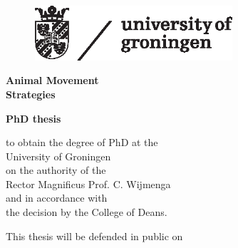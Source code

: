 
\begin{titlepage}
    \begin{addmargin}[-1cm]{-3cm}
    \begin{center}

        \hfill
        \begin{figure}
            \includegraphics[width=7.38cm,height=2.03cm]{figures/rug_logo.eps}
        \end{figure}

        \vspace{12mm}

        {
           {\fontsize{30}{30} \bfseries{Animal Movement\\Strategies}\par}\par
        }

        \vspace{21mm}

        {
           {\fontsize{15}{15} \bfseries{PhD thesis}\par}\par
        }

        \vspace{12mm}

        {\fontsize{14}{15}
            {to obtain the degree of PhD at the\\
            University of Groningen\\
            on the authority of the\\
            Rector Magnificus Prof. C. Wijmenga\\
            and in accordance with\\
            the decision by the College of Deans.}

            \vspace{3mm}

            This thesis will be defended in public on

}
\end{center}
\end{addmargin}
\end{titlepage}
